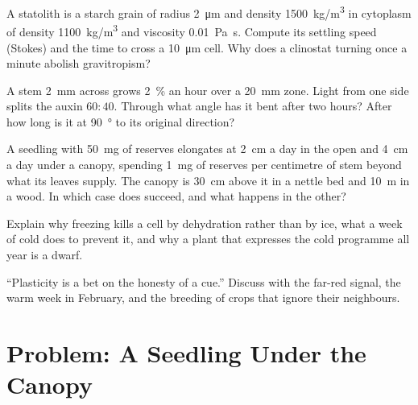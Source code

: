 \begin{exercise}[$\star\star$]\label{exo:b2:plant-plasticity:8}
A statolith is a starch grain of radius \qty{2}{\micro m} and density
\qty{1500}{kg/m^3} in cytoplasm of density \qty{1100}{kg/m^3} and
viscosity \qty{0.01}{Pa.s}. Compute its settling speed (Stokes) and
the time to cross a \qty{10}{\micro m} cell. Why does a clinostat
turning once a minute abolish gravitropism?
\end{exercise}

\begin{exercise}[$\star\star$]\label{exo:b2:plant-plasticity:9}
A stem \qty{2}{mm} across grows \qty{2}{\%} an hour over a
\qty{20}{mm} zone. Light from one side splits the auxin $60 : 40$.
Through what angle has it bent after two hours? After how long is it
at \qty{90}{\degree} to its original direction?
\end{exercise}

\begin{exercise}[$\star\star\star$]\label{exo:b2:plant-plasticity:10}
A seedling with \qty{50}{mg} of reserves elongates at \qty{2}{cm}
a day in the open and \qty{4}{cm} a day under a canopy, spending
\qty{1}{mg} of reserves per centimetre of stem beyond what its
leaves supply. The canopy is \qty{30}{cm} above it in a nettle bed
and \qty{10}{m} in a wood. In which case does 
succeed, and what happens in the other?
\end{exercise}

\begin{exercise}[$\star\star\star$]\label{exo:b2:plant-plasticity:11}
Explain why freezing kills a cell by dehydration rather than by ice,
what a week of cold does to prevent it, and why a plant that
expresses the cold programme all year is a dwarf.
\end{exercise}

\begin{exercise}[$\star\star\star$]\label{exo:b2:plant-plasticity:12}
``Plasticity is a bet on the honesty of a cue.'' Discuss with the
far-red signal, the warm week in February, and the breeding of crops
that ignore their neighbours.
\end{exercise}

\section{Problem: A Seedling Under the Canopy}

